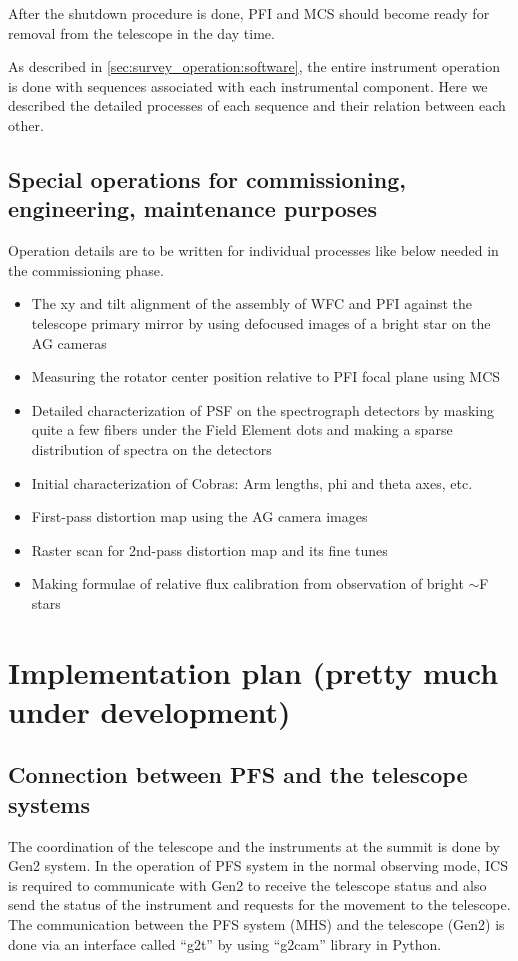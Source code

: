 \documentclass[a4paper]{article}
\begin{document}
After the shutdown procedure is done, PFI and MCS should become ready
for removal from the telescope in the day time.

As described in \ref{sec:survey_operation:software}, the entire instrument operation is done with sequences associated with each instrumental component. Here we described the detailed processes of each sequence and their relation between each other.

\subsection{Special operations for commissioning, engineering, maintenance purposes\label{sec:detail_ope_plan:engineering}}

Operation details are to be written for individual processes like
below needed in the commissioning phase.

\begin{itemize}
\item The xy and tilt alignment of the assembly of WFC and PFI against
  the telescope primary mirror by using defocused images of a bright
  star on the AG cameras
\item Measuring the rotator center position relative to PFI focal plane using MCS
\item Detailed characterization of PSF on the spectrograph detectors
  by masking quite a few fibers under the Field Element dots and making a sparse distribution of spectra on the detectors
\item Initial characterization of Cobras: Arm lengths, phi and theta axes, etc.
\item First-pass distortion map using the AG camera images
\item Raster scan for 2nd-pass distortion map and its fine tunes
\item Making formulae of relative flux calibration from observation of bright $\sim$F stars

\end{itemize}

\section{Implementation plan (pretty much under development)}
\subsection{Connection between PFS and the telescope systems}
The coordination of the telescope and the instruments at the summit is
done by Gen2 system. In the operation of PFS system in the normal
observing mode, ICS is required to communicate with Gen2 to receive
the telescope status and also send the status of the instrument and
requests for the movement to the telescope. The communication between
the PFS system (MHS) and the telescope (Gen2) is done via an interface
called ``g2t'' by using ``g2cam'' library in Python.
\end{document}
